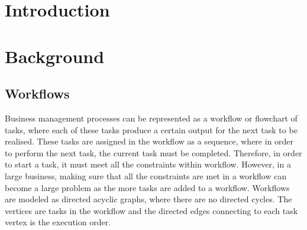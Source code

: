 \documentclass[a4paper]{report}
\begin{document}
\tableofcontents

\chapter{Introduction}

\chapter{Background}
\section{Workflows}
\setlength{\parindent}{4em}
Business management processes can be represented as a workflow or flowchart of tasks, where each of these tasks produce a certain output for the next task to be realised. These tasks are assigned in the workflow as a sequence, where in order to perform the next task, the current task must be completed. Therefore, in order to start a task, it must meet all the constraints within workflow. However, in a large business, making sure that all the constraints are met in a workflow can become a large problem as the more tasks are added to a workflow. Workflows are modeled as directed acyclic graphs\cite{AcyclicDigraph}, where there are no directed cycles. The vertices are tasks in the workflow and the directed edges connecting to each task vertex is the execution order. \par
\end{document}
